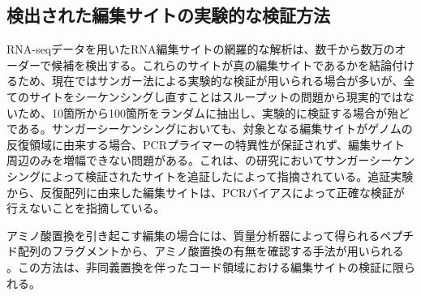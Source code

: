 \subsection{検出された編集サイトの実験的な検証方法}
RNA-seqデータを用いたRNA編集サイトの網羅的な解析は、数千から数万のオーダーで候補を検出する。これらのサイトが真の編集サイトであるかを結論付けるため、現在ではサンガー法による実験的な検証が用いられる場合が多いが、全てのサイトをシーケンシングし直すことはスループットの問題から現実的ではないため、10箇所から100箇所をランダムに抽出し、実験的に検証する場合が殆どである。サンガーシーケンシングにおいても、対象となる編集サイトがゲノムの反復領域に由来する場合、PCRプライマーの特異性が保証されず、編集サイト周辺のみを増幅できない問題がある。これは、\cite{Peng:2012aa}の研究においてサンガーシーケンシングによって検証されたサイトを追証した\cite{Piskol:2013aa}によって指摘されている。追証実験から、反復配列に由来した編集サイトは、PCRバイアスによって正確な検証が行えないことを指摘している。
\par
アミノ酸置換を引き起こす編集の場合には、質量分析器によって得られるペプチド配列のフラグメントから、アミノ酸置換の有無を確認する手法が用いられる \citep{pmid21596952}。この方法は、非同義置換を伴ったコード領域における編集サイトの検証に限られる。

